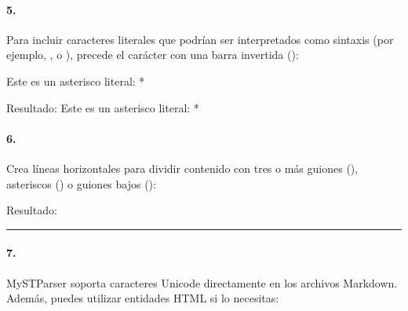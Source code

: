 \documentclass[a4paper,10pt,oneside,spanish,openany]{sphinxmanual}
\begin{document}
\paragraph{5. }
\label{\detokenize{configuracion_inicial/013.guia_de_myst_parser:caracter-de-escape}}
\sphinxAtStartPar
Para incluir caracteres literales que podrían ser interpretados como sintaxis (por ejemplo, \sphinxcode{\sphinxupquote{*}}, \sphinxcode{\sphinxupquote{\_}} o \sphinxcode{\sphinxupquote{\textasciitilde{}}}), precede el carácter con una barra invertida (\sphinxcode{\sphinxupquote{\textbackslash{}}}):

\begin{sphinxVerbatim}[commandchars=\\\{\}]
Este es un asterisco literal: \PYGZbs{}*
\end{sphinxVerbatim}

\sphinxAtStartPar
Resultado: Este es un asterisco literal: *


\paragraph{6. }
\label{\detokenize{configuracion_inicial/013.guia_de_myst_parser:separadores-horizontales}}
\sphinxAtStartPar
Crea líneas horizontales para dividir contenido con tres o más guiones (\sphinxcode{\sphinxupquote{\sphinxhyphen{}\sphinxhyphen{}\sphinxhyphen{}}}), asteriscos (\sphinxcode{\sphinxupquote{***}}) o guiones bajos (\sphinxcode{\sphinxupquote{\_\_\_}}):

\begin{sphinxVerbatim}[commandchars=\\\{\}]
\PYGZhy{}\PYGZhy{}\PYGZhy{}
\end{sphinxVerbatim}

\sphinxAtStartPar
Resultado:


\bigskip\hrule\bigskip



\paragraph{7. }
\label{\detokenize{configuracion_inicial/013.guia_de_myst_parser:letras-y-simbolos-especiales}}
\sphinxAtStartPar
MyST\sphinxhyphen{}Parser soporta caracteres Unicode directamente en los archivos Markdown. Además, puedes utilizar entidades HTML si lo necesitas:
\end{document}
